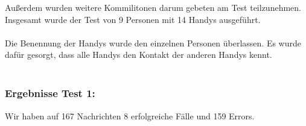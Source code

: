 Außerdem wurden weitere Kommilitonen darum gebeten am Test teilzunehmen.
Insgesamt wurde der Test von 9 Personen mit 14 Handys ausgeführt.\\\\

Die Benennung der Handys wurde den einzelnen Personen überlassen. Es
wurde dafür gesorgt, dass alle Handys den Kontakt der anderen Handys
kennt.\\\\

\subsubsection{Ergebnisse Test 1:}\label{ergebnisse-test-1-1}

Wir haben auf 167 Nachrichten 8 erfolgreiche Fälle und 159 Errors.

